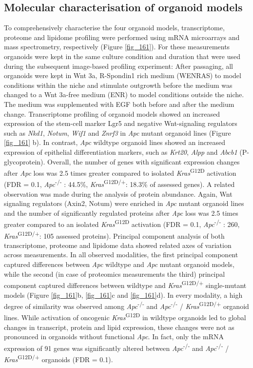\begin{flushleft}
\subsection{Molecular characterisation of organoid models}
To comprehensively characterise the four organoid models, transcriptome, proteome and lipidome profiling were performed using mRNA microarrays and mass spectrometry, respectively (Figure \ref{fig_161}). For these measurements organoids were kept in the same culture condition and duration that were used during the subsequent image-based profiling experiment: After passaging, all organoids were kept in Wnt 3a, R-Spondin1 rich medium (WENRAS) to model conditions within the niche and stimulate outgrowth before the medium was changed to a Wnt 3a-free medium (ENR) to model conditions outside the niche. The medium was supplemented with EGF both before and after the medium change. Transcriptome profiling of organoid models showed an increased expression of the stem-cell marker Lgr5 and negative Wnt-signaling regulators such as \textit{Nkd1}, \textit{Notum}, \textit{Wif1} and \textit{Znrf3} in \textit{Apc} mutant organoid lines (Figure \ref{fig_161} b). In contrast, \textit{Apc} wildtype organoid lines showed an increased expression of epithelial differentiation markers, such as \textit{Krt20}, \textit{Alpp} and \textit{Abcb1} (P-glycoprotein). Overall, the number of genes with significant expression changes after \textit{Apc} loss was 2.5 times greater compared to isolated \textit{Kras}\textsuperscript{G12D} activation (FDR = 0.1, \textit{Apc}\textsuperscript{-/-} : 44.5\%, \textit{Kras}\textsuperscript{G12D/+}: 18.3\% of assessed genes). A related observation was made during the analysis of protein abundance. Again, Wnt signaling regulators (Axin2, Notum) were enriched in \textit{Apc} mutant organoid lines and the number of significantly regulated proteins after \textit{Apc} loss was 2.5 times greater compared to an isolated \textit{Kras}\textsuperscript{G12D} activation (FDR = 0.1, \textit{Apc}\textsuperscript{-/-} : 260, \textit{Kras}\textsuperscript{G12D/+}: 105 assessed proteins). Principal component analysis of both transcriptome, proteome and lipidome data showed related axes of variation across measurements. In all observed modalities, the first principal component captured differences between \textit{Apc} wildtype and \textit{Apc} mutant organoid models, while the second (in case of proteomics measurements the third) principal component captured differences between wildtype and \textit{Kras}\textsuperscript{G12D/+} single-mutant models (Figure \ref{fig_161}b, \ref{fig_161}c and \ref{fig_161}d). In every modality, a high degree of similarity was observed among \textit{Apc}\textsuperscript{-/-}  and \textit{Apc}\textsuperscript{-/-} / \textit{Kras}\textsuperscript{G12D/+} organoid lines. While activation of oncogenic \textit{Kras}\textsuperscript{G12D} in wildtype organoids led to global changes in transcript, protein and lipid expression, these changes were not as pronounced in organoids without functional \textit{Apc}. In fact, only the mRNA expression of 91 genes was significantly altered between \textit{Apc}\textsuperscript{-/-}  and \textit{Apc}\textsuperscript{-/-} / \textit{Kras}\textsuperscript{G12D/+} organoids (FDR = 0.1). 


\end{flushleft}
